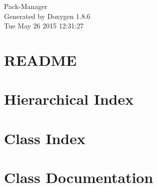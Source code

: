 \documentclass[twoside]{book}
\newcommand{\clearemptydoublepage}{%
  \newpage{\pagestyle{empty}\cleardoublepage}%
}
\begin{document}
\hypersetup{pageanchor=false}
\begin{titlepage}
\vspace*{7cm}
\begin{center}%
{\Large Pack-\/\-Manager }\\
\vspace*{1cm}
{\large Generated by Doxygen 1.8.6}\\
\vspace*{0.5cm}
{\small Tue May 26 2015 12:31:27}\\
\end{center}
\end{titlepage}
\clearemptydoublepage
\tableofcontents
\clearemptydoublepage
{}
\hypersetup{pageanchor=true}

\chapter{R\-E\-A\-D\-M\-E}
\label{md__r_e_a_d_m_e}
\hypertarget{md__r_e_a_d_m_e}{}

\chapter{Hierarchical Index}

\chapter{Class Index}

\chapter{Class Documentation}







































\newpage
{}
{}
\printindex
\end{document}
